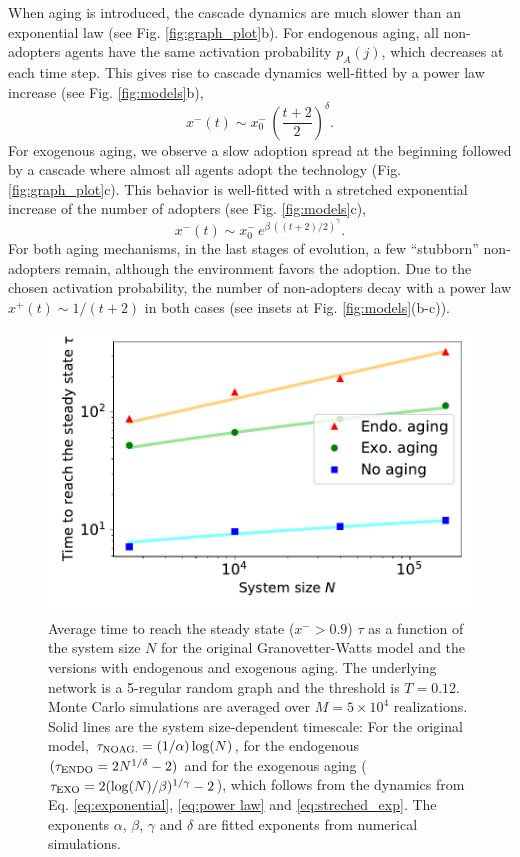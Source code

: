 When aging is introduced, the cascade dynamics are much slower than an exponential law (see Fig. \ref{fig:graph_plot}b). For endogenous aging, all non-adopters agents have the same activation probability $p_A(j)$, which decreases at each time step. This gives rise to cascade dynamics well-fitted by a power law increase (see Fig. \ref{fig:models}b),
\begin{equation}
x^{-}(t) \sim x^{-}_0 \, \left( \frac{t + 2}{2}\right)^\delta .
\label{eq:power law}
\end{equation}
For exogenous aging, we observe a slow adoption spread at the beginning followed by a cascade where almost all agents adopt the technology (Fig. \ref{fig:graph_plot}c). This behavior is well-fitted with a stretched exponential increase of the number of adopters (see Fig. \ref{fig:models}c),
\begin{equation}
x^{-}(t) \sim  x^{-}_0\,  e^{\beta \, ((t + 2) / 2)^{\gamma}} .
\label{eq:streched_exp}
\end{equation}
For both aging mechanisms, in the last stages of evolution, a few ``stubborn'' non-adopters remain, although the environment favors the adoption. Due to the chosen activation probability, the number of non-adopters decay with a power law $x^{+}(t) \sim 1/(t+2)$ in both cases (see insets at Fig. \ref{fig:models}(b-c)).

\begin{figure}
\centering \captionsetup{font=sf}
\includegraphics[width=0.6\columnwidth]{Figs/Aging_Threshold/time_steady.pdf}
\caption[Average time to reach the steady state $\tau$]{\label{fig:time_steady} Average time to reach the steady state ($x^{-} > 0.9$) $\tau$ as a function of the system size $N$ for the original Granovetter-Watts model and the versions with endogenous and exogenous aging. The underlying network is a 5-regular random graph and the threshold is $T = 0.12$. Monte Carlo simulations are averaged over $M = 5 \times 10^4$ realizations. Solid lines are the system size-dependent timescale: For the original model, $\tau_{\rm{NO AG.}} = (1/\alpha)\log(N)$, for the endogenous $(\tau_{\rm{ENDO}} = 2N^{1/\delta} - 2)$ and for the exogenous aging ($\tau_{\rm{EXO}} = 2(\log(N)/\beta)^{1/\gamma} - 2$), which follows from the dynamics from Eq. \eqref{eq:exponential}, \eqref{eq:power law} and \eqref{eq:streched_exp}. The exponents $\alpha$, $\beta$, $\gamma$ and $\delta$ are fitted exponents from numerical simulations.}
\end{figure}

